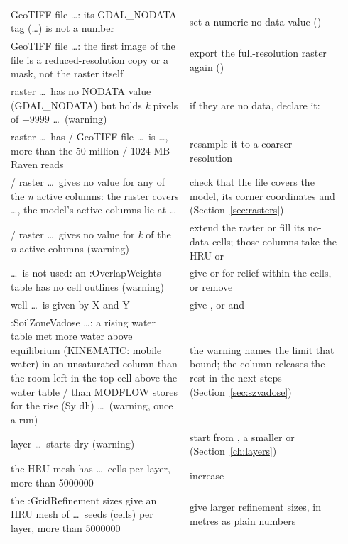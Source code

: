 \begin{longtable}{P{0.5\linewidth}P{0.44\linewidth}}
GeoTIFF file \dots: its GDAL\_NODATA tag (\dots) is not a number & set a numeric no-data value ()\\
GeoTIFF file \dots: the first image of the file is a reduced-resolution copy or a mask, not the raster itself & export the full-resolution raster again ()\\
raster \dots\ has no NODATA value (GDAL\_NODATA) but holds \emph{k} pixels of $-9999$ \dots\ (warning) & if they are no data, declare it: \\
raster \dots\ has / GeoTIFF file \dots\ is \dots, more than the 50 million / 1024 MB Raven reads & resample it to a coarser resolution\\
 /  raster \dots\ gives no value for any of the \emph{n} active columns: the raster covers \dots, the model's active columns lie at \dots & check that the file covers the model, its corner coordinates and  (Section~\ref{sec:rasters})\\
 /  raster \dots\ gives no value for \emph{k} of the \emph{n} active columns (warning) & extend the raster or fill its no-data cells; those columns take the HRU  or \\
 \dots\ is not used: an :OverlapWeights table has no cell outlines (warning) & give  or  for relief within the cells, or remove \\
well \dots\ is given by X and Y & give , or  and \\
:SoilZoneVadose \dots: a rising water table met more water above equilibrium (KINEMATIC: mobile water) in an unsaturated column than the room left in the top cell above the water table / than MODFLOW stores for the rise (Sy dh) \dots\ (warning, once a run) & the warning names the limit that bound; the column releases the rest in the next steps (Section~\ref{sec:szvadose})\\
layer \dots\ starts dry (warning) & start from , a smaller  or  (Section~\ref{ch:layers})\\
the HRU mesh has \dots\ cells per layer, more than 5000000 & increase \\
the :GridRefinement sizes give an HRU mesh of \dots\ seeds (cells) per layer, more than 5000000 & give larger refinement sizes, in metres as plain numbers\\

\end{longtable}
